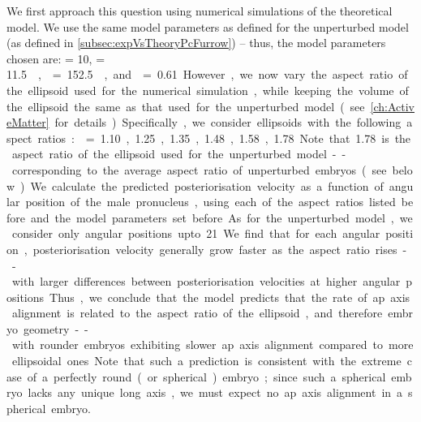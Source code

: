 We first approach this question using numerical simulations of the theoretical model. We use the same model parameters as defined for the unperturbed model (as defined in \autoref{subsec:expVsTheoryPcFurrow}) -- thus, the model parameters chosen are: \hydrodynamicLength = \SI{10}{\unitLength}, \activeRelaxLength = \SI{11.5}{\square\unitLength\per\second}, \nematicLength = \SI{152.5}{\square\unitLength\per\second}, and \dragCoefficient = \num{0.61}. However, we now vary the aspect ratio of the ellipsoid used for the numerical simulation, while keeping the volume of the ellipsoid the same as that used for the unperturbed model (see \autoref{ch:ActiveMatter} for details). Specifically, we consider ellipsoids with the following aspect ratios: \aspectRatio = \num{1.10}, \num{1.25}, \num{1.35}, \num{1.48}, \num{1.58}, \num{1.78}. Note that \num{1.78} is the aspect ratio of the ellipsoid used for the unperturbed model -- corresponding to the average aspect ratio of unperturbed embryos (see below). We calculate the predicted posteriorisation velocity as a function of angular position of the male pronucleus, using each of the aspect ratios listed before and the model parameters set before. As for the unperturbed model, we consider only angular positions upto \SI{21}{\unitAngle}. We find that for each angular position, posteriorisation velocity generally grow faster as the aspect ratio rises -- with larger differences between posteriorisation velocities at higher angular positions. Thus, we conclude that the model predicts that the rate of \ac{ap} axis alignment is related to the aspect ratio of the ellipsoid, and therefore embryo geometry -- with rounder embryos exhibiting slower \ac{ap} axis alignment compared to more ellipsoidal ones. Note that such a prediction is consistent with the extreme case of a perfectly round (or spherical) embryo; since such a spherical embryo lacks any unique long axis, we must expect no \ac{ap} axis alignment in a spherical embryo.

